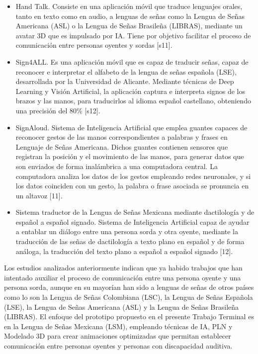\begin{itemize}
\item Hand Talk. Consiste en una aplicación móvil que traduce lenguajes orales, tanto en texto como en audio, a lenguas de señas como la Lengua de Señas Americana (ASL) o la Lengua de Señas Brasileña (LIBRAS), mediante un avatar 3D que es impulsado por IA. Tiene por objetivo facilitar el proceso de comunicación entre personas oyentes y sordas [s11]. 
\item Sign4ALL. Es una aplicación móvil que es capaz de traducir señas, capaz de reconocer e interpretar el alfabeto de la lengua de señas española (LSE), desarrollada por la Universidad de Alicante. Mediante técnicas de Deep Learning y Visión Artificial, la aplicación captura e interpreta signos de los brazos y las manos, para traducirlos al idioma español castellano, obteniendo una precisión del 80\% [s12].
\item SignAloud. Sistema de Inteligencia Artificial que emplea guantes capaces de reconocer gestos de las manos correspondientes a palabras y frases en Lenguaje de Señas Americana. Dichos guantes contienen sensores que registran la posición y el movimiento de las manos, para generar datos que son enviados de forma inalámbrica a una computadora central. La computadora analiza los datos de los gestos empleando redes neuronales, y si los datos coinciden con un gesto, la palabra o frase asociada se pronuncia en un altavoz [11].
\item Sistema traductor de la Lengua de Señas Mexicana mediante dactilología y de español a español signado. Sistema de Inteligencia Artificial capaz de ayudar a entablar un diálogo entre una persona sorda y otra oyente, mediante la traducción de las señas de dactilología a texto plano en español y de forma análoga, la traducción del texto plano a español a español signado [12].
\end{itemize}

Los estudios analizados anteriormente indican que ya habido trabajos que han intentado auxiliar el proceso de comunicación entre una persona oyente y una persona sorda, aunque en su mayorían han sido a lenguas de señas de otros países como lo son la Lengua de Señas Colombiana (LSC), la Lengua de Señas Española (LSE), la Lengua de Señas Americana (ASL) y la Lengua de Señas Brasileña (LIBRAS). El enfoque del prototipo propuesto en el presente Trabajo Terminal es en la Lengua de Señas Mexicana (LSM), empleando técnicas de IA, PLN y Modelado 3D para crear animaciones optimizadas que permitan establecer comunicación entre personas oyentes y personas con discapacidad auditiva. \\

